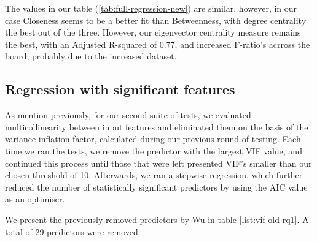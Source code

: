 \documentclass[bsc,frontabs,twoside,singlespacing,parskip,deptreport]{infthesis}
\begin{document}
The values in our table (\ref{tab:full-regression-new}) are similar, however, in our case Closeness seems to be a better fit than Betweenness, with degree centrality the best out of the three. However, our eigenvector centrality measure remains the best, with an Adjusted R-squared of 0.77, and increased F-ratio's acrross the board, probably due to the increased dataset.

\begin{table}[!h]
\centering
{}
\caption{Results for full regression of the expanded dataset}
\label{tab:full-regression-new}
\end{table}

\subsection{Regression with significant features}\label{regression-stepwise}

As mention previously, for our second suite of tests, we evaluated multicollinearity between input features and eliminated them on the basis of the variance inflation factor, calculated during our previous round of testing. Each time we ran the tests, we remove the predictor with the largest VIF value, and continued this process until those that were left presented VIF's smaller than our chosen threshold of 10. Afterwards, we ran a stepwise regression, which further reduced the number of statistically significant predictors by using the AIC value as an optimiser.

We present the previously removed predictors by Wu \cite{masters} in table \ref{list:vif-old-rq1}. A total of 29 predictors were removed.
\end{document}
